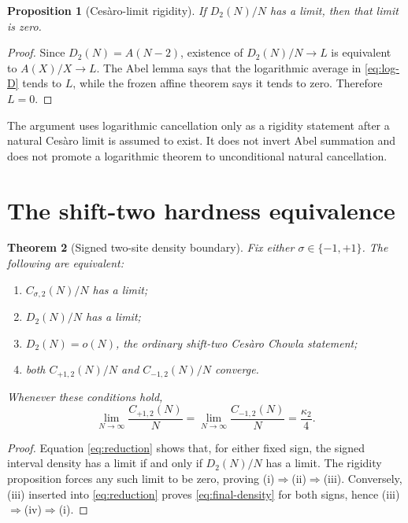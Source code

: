 \documentclass[11pt]{article}
\newtheorem{theorem}{Theorem}[section]
\newtheorem{proposition}[theorem]{Proposition}
\theoremstyle{definition}
\theoremstyle{remark}
\begin{document}
\begin{proposition}[Ces\`aro-limit rigidity]
If $D_2(N)/N$ has a limit, then that limit is zero.
\end{proposition}

\begin{proof}
Since $D_2(N)=A(N-2)$, existence of $D_2(N)/N\to L$ is equivalent to
$A(X)/X\to L$.  The Abel lemma says that the logarithmic average in
\eqref{eq:log-D} tends to $L$, while the frozen affine theorem says it tends
to zero.  Therefore $L=0$.
\end{proof}

The argument uses logarithmic cancellation only as a rigidity statement
after a natural Ces\`aro limit is assumed to exist.  It does not invert Abel
summation and does not promote a logarithmic theorem to unconditional
natural cancellation.

\section{The shift-two hardness equivalence}

\begin{theorem}[Signed two-site density boundary]
Fix either $\sigma\in\{-1,+1\}$.  The following are equivalent:
\begin{enumerate}[label=(\roman*),leftmargin=*]
\item $C_{\sigma,2}(N)/N$ has a limit;
\item $D_2(N)/N$ has a limit;
\item $D_2(N)=o(N)$, the ordinary shift-two Ces\`aro Chowla statement;
\item both $C_{+1,2}(N)/N$ and $C_{-1,2}(N)/N$ converge.
\end{enumerate}
Whenever these conditions hold,
\begin{equation}
 \boxed{\displaystyle
 \lim_{N\to\infty}\frac{C_{+1,2}(N)}N
 =\lim_{N\to\infty}\frac{C_{-1,2}(N)}N
 =\frac{\kappa_2}{4}.}
 \label{eq:final-density}
\end{equation}
\end{theorem}

\begin{proof}
Equation \eqref{eq:reduction} shows that, for either fixed sign, the signed
interval density has a limit if and only if $D_2(N)/N$ has a limit.  The
rigidity proposition forces any such limit to be zero, proving
(i)$\Rightarrow$(ii)$\Rightarrow$(iii).  Conversely, (iii) inserted into
\eqref{eq:reduction} proves \eqref{eq:final-density} for both signs, hence
(iii)$\Rightarrow$(iv)$\Rightarrow$(i).
\end{proof}
\end{document}
